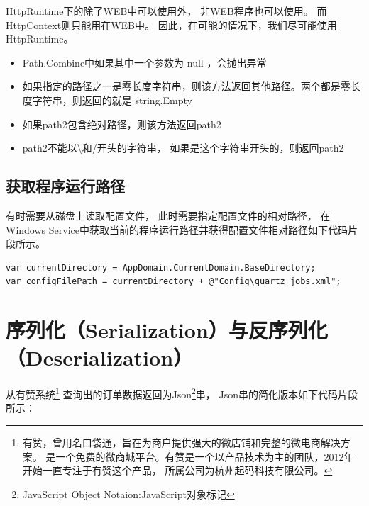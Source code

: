 \documentclass{book}
\begin{document}
HttpRuntime下的除了WEB中可以使用外，
非WEB程序也可以使用。
而HttpContext则只能用在WEB中。
因此，在可能的情况下，我们尽可能使用HttpRuntime。

\begin{itemize}
\item{Path.Combine中如果其中一个参数为 null ，会抛出异常}
\item{如果指定的路径之一是零长度字符串，则该方法返回其他路径。两个都是零长度字符串，则返回的就是 string.Empty}
\item{如果path2包含绝对路径，则该方法返回path2}
\item{path2不能以\textbackslash 和/开头的字符串， 如果是这个字符串开头的，则返回path2}
\end{itemize}

\subsection{获取程序运行路径}

有时需要从磁盘上读取配置文件，
此时需要指定配置文件的相对路径，
在Windows Service中获取当前的程序运行路径并获得配置文件相对路径如下代码片段所示。

\begin{lstlisting}[language={[Sharp]C}]
var currentDirectory = AppDomain.CurrentDomain.BaseDirectory;
var configFilePath = currentDirectory + @"Config\quartz_jobs.xml";
\end{lstlisting}

\section{序列化（Serialization）与反序列化（Deserialization）}

从有赞系统\footnote{有赞，曾用名口袋通，旨在为商户提供强大的微店铺和完整的微电商解决方案。
是一个免费的微商城平台。有赞是一个以产品技术为主的团队，2012年开始一直专注于有赞这个产品，
所属公司为杭州起码科技有限公司。}
查询出的订单数据返回为Json\footnote{JavaScript Object Notaion:JavaScript对象标记}串，
Json串的简化版本如下代码片段所示：
\end{document}

